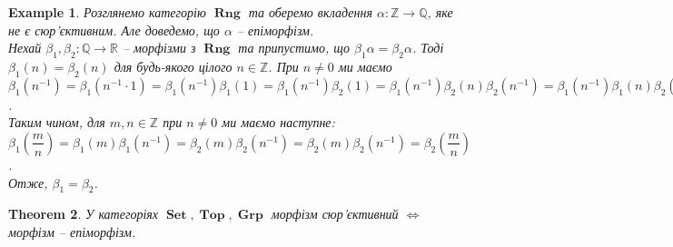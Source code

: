 \documentclass[a4paper, 10pt]{article}
\theoremstyle{theoremdd}
\newtheorem{theorem}{Theorem}[subsection]
\newtheorem{example}[theorem]{Example}
\DeclareMathOperator{\Set}{\textbf{Set}}
\DeclareMathOperator{\Grp}{\textbf{Grp}}
\DeclareMathOperator{\Rng}{\textbf{Rng}}
\DeclareMathOperator{\Top}{\textbf{Top}}
\begin{document}
\begin{example}
Розглянемо категорію $\Rng$ та оберемо вкладення $\alpha \colon \mathbb{Z} \to \mathbb{Q}$, яке не є сюр'єктивним. Але доведемо, що $\alpha$ -- епіморфізм.\\
Нехай $\beta_1,\beta_2 \colon \mathbb{Q} \to \mathbb{R}$ -- морфізми з $\Rng$ та припустимо, що $\beta_1 \alpha = \beta_2 \alpha$. Тоді $\beta_1(n) = \beta_2(n)$ для будь-якого цілого $n \in \mathbb{Z}$. При $n \neq 0$ ми маємо \\
$\beta_1(n^{-1}) = \beta_1(n^{-1} \cdot 1) = \beta_1(n^{-1})\beta_1(1) = \beta_1(n^{-1}) \beta_2(1) = \beta_1(n^{-1})\beta_2(n)\beta_2(n^{-1}) = \beta_1(n^{-1})\beta_1(n)\beta_2(n^{-1}) = \beta_1(1)\beta_2(n^{-1}) = \beta_2(1)\beta_2(n^{-1}) = \beta_2(1 \cdot n^{-1}) = \beta_2(n^{-1})$.\\
Таким чином, для $m,n \in \mathbb{Z}$ при $n \neq 0$ ми маємо наступне:\\
$\beta_1\left( \dfrac{m}{n} \right) = \beta_1(m) \beta_1(n^{-1}) = \beta_2(m) \beta_2(n^{-1}) = \beta_2(m) \beta_2(n^{-1}) = \beta_2\left( \dfrac{m}{n} \right)$.\\
Отже, $\beta_1 = \beta_2$.
\end{example}

\begin{theorem}
У категоріях $\Set, \Top, \Grp$ морфізм сюр'єктивний $\iff$ морфізм -- епіморфізм.
\end{theorem}
\end{document}
